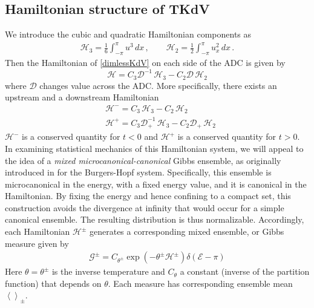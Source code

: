\documentclass[11pt]{article}
\newcommand{\mean}[1]{\left< #1 \right>}
\newcommand{\dx}{\, dx}
\newcommand{\drat}{\mathcal{D}}
\newcommand{\dratdn}{\drat_+}
\newcommand{\En}{\mathcal{E}}
\newcommand{\Ham}{\mathcal{H}}
\newcommand{\Hthree}{\Ham_{3}}
\newcommand{\Htwo}{\Ham_{2}}
\newcommand{\Hup}{\Ham^{-}}
\newcommand{\Hdn}{\Ham^{+}}
\newcommand{\Hupdn}{\Ham^{\pm}}
\newcommand{\Gibbs}{\mathcal{G}}
\newcommand{\Gupdn}{\Gibbs^{\pm}}
\newcommand{\thupdn}{\theta^{\pm}}
\begin{document}
\subsection{Hamiltonian structure of TKdV}

We introduce the cubic and quadratic Hamiltonian components as
\begin{align}
\Hthree = \frac{1}{6} \int_{-\pi}^{\pi} u^3 \dx	\, , \qquad
\Htwo = \frac{1}{2} \int_{-\pi}^{\pi} u_x^2 \dx	\, .
\end{align}
Then the Hamiltonian of \eqref{dimlessKdV} on each side of the ADC is given by
\begin{equation}
\Ham = C_3 \drat^{-1} \, \Hthree - C_2 \drat \, \Htwo
\end{equation}
where $\drat$ changes value across the ADC. More specifically, there exists an upstream and a downstream Hamiltonian
\begin{align}
&\Hup = C_3 \, \Hthree - C_2 \, \Htwo \\
&\Hdn = C_3 \dratdn^{-1} \, \Hthree - C_2 \dratdn \, \Htwo
\end{align}
$\Hup$ is a conserved quantity for $t<0$ and $\Hdn$ is a conserved quantity for $t>0$. In examining statistical mechanics of this Hamiltonian system, we will appeal to the idea of a {\em mixed microcanonical-canonical} Gibbs ensemble, as originally introduced in \cite{abramov2003hamiltonian} for the Burgers-Hopf system. Specifically, this ensemble is microcanonical in the energy, with a fixed energy value, and it is canonical in the Hamiltonian. By fixing the energy and hence confining to a compact set, this construction avoids the divergence at infinity that would occur for a simple canonical ensemble. The resulting distribution is thus normalizable.
Accordingly, each Hamiltonian $\Ham^{\pm}$ generates a corresponding mixed ensemble, or Gibbs measure given by 
\begin{align}
\Gupdn = C_{\thupdn} \exp(-\thupdn \Hupdn) \delta(\En - \pi)
\end{align}
Here $\theta = \thupdn$ is the inverse temperature and $C_{\theta}$ a constant (inverse of the partition function) that depends on $\theta$. Each measure has corresponding ensemble mean $\mean{}_{\pm}$. 

\end{document}
